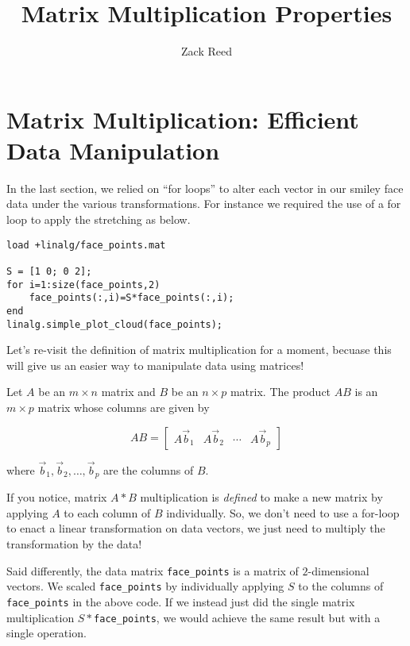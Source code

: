 \documentclass{ximera}
\author{Zack Reed}
\title{Matrix Multiplication Properties}
\begin{document}
\begin{abstract}

\end{abstract}
\maketitle

\section*{Matrix Multiplication: Efficient Data Manipulation}

In the last section, we relied on ``for loops'' to alter each vector in our smiley face data under the various transformations. For instance we required the use of a for loop to apply the stretching as below.

\begin{verbatim}
load +linalg/face_points.mat

S = [1 0; 0 2];
for i=1:size(face_points,2)
    face_points(:,i)=S*face_points(:,i);
end
linalg.simple_plot_cloud(face_points);
\end{verbatim}

Let's re-visit the definition of matrix multiplication for a moment, becuase this will give us an easier way to manipulate data using matrices!

\begin{definition}

    Let $A$ be an $m\times n$ matrix and $B$ be an $n\times p$ matrix. The product $AB$ is an $m\times p$ matrix whose columns are given by 

    $$AB=\begin{bmatrix} A\vec{b}_1 & A\vec{b}_2 & \cdots & A\vec{b}_p \end{bmatrix}$$

    where $\vec{b}_1,\vec{b}_2,\ldots,\vec{b}_p$ are the columns of $B$.

\end{definition}

If you notice, matrix $A*B$ multiplication is \emph{defined} to make a new matrix by applying $A$ to each column of $B$ individually. So, we don't need to use a for-loop to enact a linear transformation on data vectors, we just need to multiply the transformation by the data!

Said differently, the data matrix \texttt{face\_points} is a matrix of $2$-dimensional vectors. We scaled \texttt{face\_points} by individually applying $S$ to the columns of \texttt{face\_points} in the above code. If we instead just did the single matrix multiplication $S*$\texttt{face\_points}, we would achieve the same result but with a single operation. 
\end{document}
